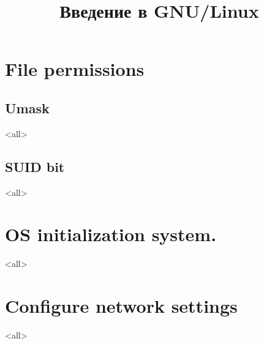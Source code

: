 

\title{Введение в GNU/Linux}





\begin{frame}
	\frametitle{}
	\titlepage
	\vspace{-0.5cm}
	\begin{center}
	\end{center}
\end{frame}



\section{File permissions}
\subsection{Umask}
\mode<all>{}
\subsection{SUID bit}
\mode<all>{}
\section{OS initialization system.}
\mode<all>{}


\section{Configure network settings}
\mode<all>{}


